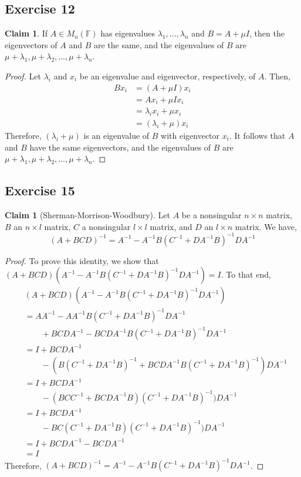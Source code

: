 \documentclass[letterpaper,12pt]{article}
\theoremstyle{definition}
\newtheorem{claim}[theorem]{Claim}
\begin{document}
\subsection*{Exercise 12}
\begin{claim}
	If $A \in M_n (\mathbb{F})$ has eigenvalues $\lambda_1, \ldots, \lambda_n$ and $B = A + \mu I$, then the eigenvectors of $A$ and $B$ are the same, and the eigenvalues of $B$ are $\mu + \lambda_1, \mu + \lambda_2, \ldots, \mu + \lambda_n$. 
\end{claim}
\begin{proof}
	Let $\lambda_i$ and $x_i$ be an eigenvalue and eigenvector, respectively, of $A$. Then,
	\begin{align*}
		Bx_i &= (A + \mu I)x_i \\
		&= Ax_i + \mu I x_i \\
		&= \lambda_i  x_i+ \mu x_i \\
		&= (\lambda_i + \mu) x_i
	\end{align*}
	Therefore, $(\lambda_i + \mu)$ is an eigenvalue of $B$ with eigenvector $x_i$.  It follows that $A$ and $B$ have the same eigenvectors, and the eigenvalues of $B$ are $\mu + \lambda_1, \mu + \lambda_2, \ldots, \mu + \lambda_n$. 
\end{proof}

\subsection*{Exercise 15}
\begin{claim}[Sherman-Morrison-Woodbury]
	Let $A$ be a nonsingular $n \times n$ matrix, $B$ an $n \times l$ matrix, $C$ a nonsingular $l \times l$ matrix, and $D$ an $l \times n$ matrix. We have,
	\begin{equation}
	(A + BCD)^{-1} = A^{-1} - A^{-1} B (C^{-1} + DA^{-1}B)^{-1} D A^{-1}
	\end{equation}
\end{claim}
\begin{proof}
	To prove this identity, we show that $(A + BCD) (A^{-1} - A^{-1} B (C^{-1} + DA^{-1}B)^{-1} D A^{-1}) = I$. To that end,
	\begin{align*}
	&(A + BCD) (A^{-1} - A^{-1} B (C^{-1} + DA^{-1}B)^{-1} D A^{-1}) \\
	&= AA^{-1} - AA^{-1} B (C^{-1} + DA^{-1}B)^{-1} D A^{-1} \\
	&\qquad + BCDA^{-1} - BCDA^{-1} B (C^{-1} + DA^{-1}B)^{-1} D A^{-1} \\
	&= I + BCDA^{-1} \\
	&\qquad - (B (C^{-1} + DA^{-1}B)^{-1} + BCDA^{-1} B (C^{-1} + DA^{-1}B)^{-1}) D A^{-1} \\
	&= I + BCDA^{-1} \\
	&\qquad - (BCC^{-1} + BCDA^{-1}B)(C^{-1} + DA^{-1}B)^{-1}) D A^{-1} \\
	&= I + BCDA^{-1} \\
	&\qquad - BC(C^{-1} + DA^{-1}B)(C^{-1} + DA^{-1}B)^{-1}) D A^{-1} \\
	&= I + BCDA^{-1} - BCDA^{-1} \\
	&= I
	\end{align*}
	Therefore, $(A + BCD)^{-1} = A^{-1} - A^{-1} B (C^{-1} + DA^{-1}B)^{-1} D A^{-1}$.
\end{proof}
\end{document}

